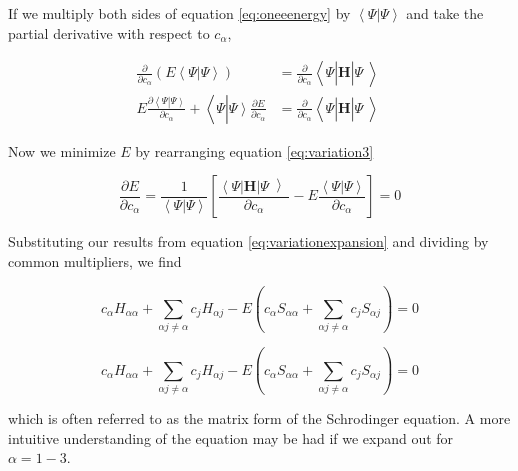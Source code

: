 If we multiply both sides of equation \ref{eq:oneeenergy} by
$\left<\right.\Psi\left.\right|\left.\Psi\left.\right.\right>$ and
take the partial derivative with respect to $c_{\alpha}$,

\begin{align}
  \frac{\partial}{\partial c_{\alpha}}
  \left( E \left<\right.\Psi\left.\right|\left.\Psi\left.\right.\right> \right)&=
										 \frac{\partial}{\partial c_{\alpha}}
										 \left<\right.\Psi\left|\right.\bm{H}\left.\right|\Psi\left>\right. \\
  \label{eq:variation3}
  E \frac{\partial \left<\right.\Psi\left.\right|\left.\Psi\left.\right.\right>}{\partial c_{\alpha}}
  + \left<\right.\Psi\left.\right|\left.\Psi\left.\right.\right> \frac{\partial E}{\partial c_{\alpha}} &=
													  \frac{\partial}{\partial c_{\alpha}}
													  \left<\right.\Psi\left|\right.\bm{H}\left.\right|\Psi\left>\right.
\end{align}

Now we minimize $E$ by rearranging equation \ref{eq:variation3}

\begin{equation}
  \frac{\partial E}{\partial c_{\alpha}} =
  \frac{1}{\left<\right.\Psi\left.\right|\left.\Psi\left.\right.\right>}
  \left[
    \frac{\left<\right.\Psi\left|\right.\bm{H}\left.\right|\Psi\left>\right.}
    {\partial c_{\alpha}}
    -E \frac{\left<\right.\Psi\left.\right|\left.\Psi\left.\right.\right>}
    {\partial c_{\alpha}}
  \right] = 0
\end{equation}

Substituting our results from equation \ref{eq:variationexpansion} and
dividing by common multipliers, we find

\begin{equation}
  c_{\alpha} H_{\alpha \alpha} + \sum_{\alpha j \neq \alpha} c_j H_{\alpha j} -
  E \left( c_{\alpha} S_{\alpha \alpha} + \sum_{\alpha j \neq \alpha} c_j S_{\alpha j} \right) = 0
\end{equation}

\begin{equation}
  c_{\alpha} H_{\alpha \alpha} + \sum_{\alpha j \neq \alpha} c_j H_{\alpha j} -
  E \left( c_{\alpha} S_{\alpha \alpha} + \sum_{\alpha j \neq \alpha} c_j S_{\alpha j} \right) = 0
\end{equation}

which is often referred to as the matrix form of the Schrodinger
equation.  A more intuitive understanding of the equation may be had
if we expand out for $\alpha=1-3$.

